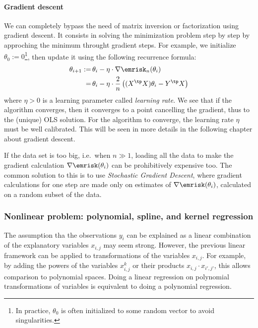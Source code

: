 \documentclass{../cs-classes/cs-classes}
\begin{document}
\paragraph*{Gradient descent}
We can completely bypass the need of matrix inversion or factorization using gradient descent. It consists in solving the minimization problem step by step by approching the minimum throught gradient steps. For example, we initialize $\theta_0:=0$\footnote{In practice, $\theta_0$ is often initialized to some random vector to avoid singularities.}, then update it using the following recurrence formula:
\begin{equation*}
    \begin{aligned}
        \theta_{i+1} :=&\, \theta_i -\eta\cdot\nabla\emrisk_n(\theta_i)\\
        =&\, \theta_i - \eta\cdot\frac{2}{n}\left((X^\tp X)\theta_i - Y^\tp X\right)
    \end{aligned}
\end{equation*}
where $\eta>0$ is a learning parameter called \emph{learning rate}. We see that if the algorithm converges, then it converges to a point cancelling the gradient, thus to the (unique) OLS solution. For the algorithm to converge, the learning rate $\eta$ must be well calibrated. This will be seen in more details in the following chapter about gradient descent.

If the data set is too big, i.e.~when $n\gg1$, loading all the data to make the gradient calculation $\nabla\emrisk(\theta_i)$ can be prohibitively expensive too. The common solution to this is to use \emph{Stochastic Gradient Descent}, where gradient calculations for one step are made only on estimates of $\nabla\emrisk(\theta_i)$, calculated on a random subset of the data.

\subsubsection{Nonlinear problem: polynomial, spline, and kernel regression}
The assumption tha the observations $y_i$ can be explained as a linear combination of the explanatory variables $x_{i, j}$ may seem strong. However, the previous linear framework can be applied to transformations of the variables $x_{i, j}$. For example, by adding the powers of the variables $x^k_{i, j}$ or their products $x_{i, j}\cdot x_{i', j'}$, this allows comparison to polynomial spaces. Doing a linear regression on polynomial transformations of variables is equivalent to doing a polynomial regression.
\end{document}
